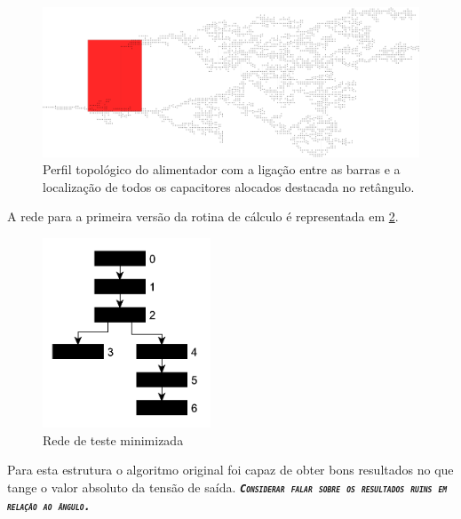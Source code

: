 \documentclass{IEEEtran}
\begin{document}
\begin{figure}
\centering
\includegraphics[width=155mm]{axxxx-05.pdf}
\caption{Perfil topológico do alimentador com a ligação entre as barras e a localização de todos os capacitores alocados destacada no retângulo.}
\label{top}
\end{figure}

A rede para a primeira versão da rotina de cálculo é representada em \ref{top_moc}.

\begin{figure}
	\centering
	\includegraphics[width=50mm]{rede_moc.pdf}
	\caption{Rede de teste minimizada}
	\label{top_moc}
\end{figure}

Para esta estrutura o algoritmo original foi capaz de obter bons resultados no que tange o valor absoluto da tensão de saída.
\emph{\textbf{\textit{\textsl{\texttt{\textsc{Considerar falar sobre os resultados ruins em relação ao ângulo.}}}}}}
\end{document}
